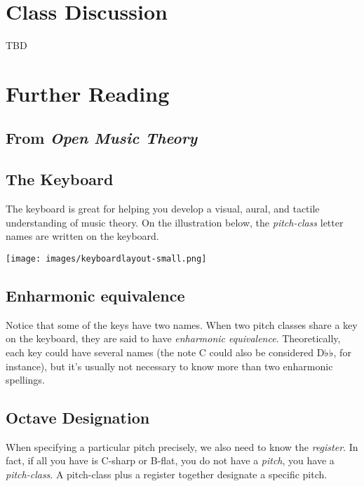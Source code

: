 \documentclass{book}
\begin{document}
\hypertarget{class-discussion-33}{%
\section{Class Discussion}\label{class-discussion-33}}

TBD

\hypertarget{further-reading-20}{%
\section{Further Reading}\label{further-reading-20}}

\hypertarget{from-open-music-theory-19}{%
\subsection{\texorpdfstring{From \emph{Open Music
Theory}}{From Open Music Theory}}\label{from-open-music-theory-19}}

\hypertarget{the-keyboard}{%
\subsection{The Keyboard}\label{the-keyboard}}

The keyboard is great for helping you develop a visual, aural, and tactile
understanding of music theory. On the illustration below, the
\emph{pitch-class} letter names are written on the keyboard.

\texttt{[image: images/keyboardlayout-small.png]}

\hypertarget{enharmonic-equivalence}{%
\subsection{Enharmonic equivalence}\label{enharmonic-equivalence}}

Notice that some of the keys have two names. When two pitch classes share a
key on the keyboard, they are said to have \emph{enharmonic equivalence}.
Theoretically, each key could have several names (the note C could also be
considered D♭♭, for instance), but it's usually not necessary to know more
than two enharmonic spellings.

\hypertarget{octave-designation}{%
\subsection{Octave Designation}\label{octave-designation}}

When specifying a particular pitch precisely, we also need to know the
\emph{register}. In fact, if all you have is C-sharp or B-flat, you do not
have a \emph{pitch}, you have a \emph{pitch-class}. A pitch-class plus a
register together designate a specific pitch.
\end{document}
